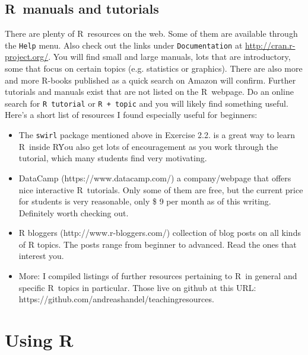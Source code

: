 \documentclass [11pt]{article}
\newcommand{\code}[1]{{\tt #1}}
\newcommand\R{{\sf R}}
\numberwithin{exercise}{section}
\begin{document}
\subsection{\R\ manuals and tutorials \label{manualsec}}
There are plenty of \R\ resources on the web. Some of them are available through the \code{Help} menu. Also check out the links under \code{Documentation} at \url{http://cran.r-project.org/}. You will find small and large manuals, lots that are introductory, some that focus on certain topics (e.g. statistics or graphics). There are also more and more \R-books published as a quick search on Amazon will confirm. Further tutorials and manuals exist that are not listed on the \R\ webpage. Do an online search for \code{\R\ tutorial} or \code{\R\ + topic} and you will likely find something useful. Here's a short list of resources I found especially useful for beginners:

\begin{itemize}
\item{The \code{swirl} package mentioned above in Exercise 2.2. is a great way to learn \R\ inside \R\. You also get lots of encouragement as you work through the tutorial, which many students find very motivating.}

\item{DataCamp (https://www.datacamp.com/) a company/webpage that offers nice interactive \R\ tutorials. Only some of them are free, but the current price for students is very reasonable, only \$ 9 per month as of this writing. Definitely worth checking out.}

\item{R bloggers (http://www.r-bloggers.com/) collection of blog posts on all kinds of R topics. The posts range from beginner to advanced. Read the ones that interest you.}

\item{More: I compiled listings of further resources pertaining to \R\ in general and specific \R\ topics in particular. Those live on github at this URL: \\ https://github.com/andreashandel/teachingresources.}
\end{itemize}



\section{Using \R \label{secusingr}}
\end{document}
